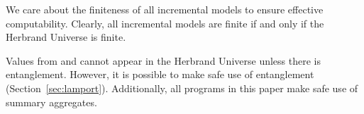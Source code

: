 We care about the finiteness of all incremental models to ensure effective
computability.  Clearly, all incremental models are finite if and only if the
Herbrand Universe is finite.

Values from  and  cannot appear in the
Herbrand Universe unless there is entanglement.  However, it is possible to
make safe use of entanglement (Section~\ref{sec:lamport}).  Additionally, all
programs in this paper make safe use of summary aggregates.
